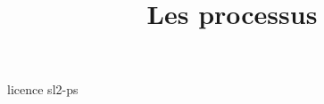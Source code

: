 \documentclass [xcolor=table] {beamer}
\title {Les processus}
\begin{document}
 {licence}
 {sl2-ps}
\end{document}
